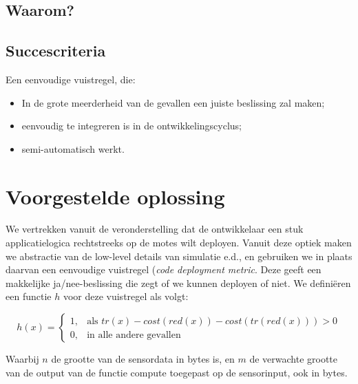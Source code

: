 \documentclass{article}
\begin{document}
\subsection{Waarom?}


\subsection{Succescriteria}

Een eenvoudige vuistregel, die:
\begin{itemize}
\item In de grote meerderheid van de gevallen een juiste beslissing zal maken;
\item eenvoudig te integreren is in de ontwikkelingscyclus;
\item semi-automatisch werkt.
\end{itemize}

\section{Voorgestelde oplossing}
We vertrekken vanuit de veronderstelling dat de ontwikkelaar een stuk
applicatielogica rechtstreeks op de motes wilt deployen. Vanuit deze optiek
maken we abstractie van de low-level details van simulatie e.d., en gebruiken we
in plaats daarvan een eenvoudige vuistregel (\textit{code deployment
metric}. Deze geeft een makkelijke ja/nee-beslissing die zegt of we kunnen
deployen of niet. We defini\"eren een functie $h$ voor deze vuistregel als
volgt:

\[

    h(x)= 
\begin{cases}
  1, & \text{als } tr(x) - cost(red(x)) - cost(tr(red(x))) > 0  \\
  0, & \text{in alle andere gevallen}
\end{cases}
\]

Waarbij $n$ de grootte van de sensordata in bytes is, en $m$ de verwachte
grootte van de output van de functie compute toegepast op de sensorinput, ook in
bytes.
\end{document}
